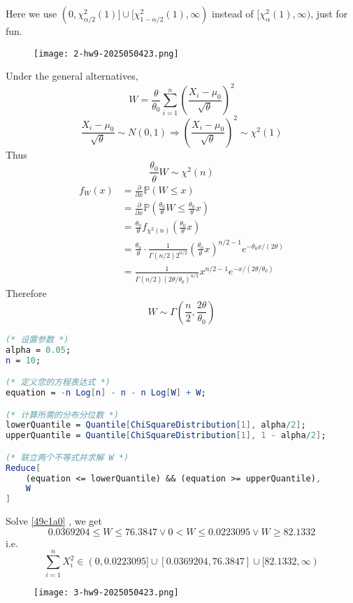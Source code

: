 \begin{remark}
Here we use $(0,\chi^{2}_{\alpha/2 }(1)]\cup[\chi^{2}_{1-\alpha/2 }(1),\infty)$ instead of $[\chi^{2}_{\alpha}(1),\infty)$, just for fun.
\end{remark}
\begin{exercise}
\begin{figure}[H]
\centering
\texttt{[image: 2-hw9-2025050423.png]}
\label{}
\end{figure}
\end{exercise}
Under the general alternatives,
\[
W=\frac{\theta}{\theta_0}\sum_{i=1}^{n} \left( \frac{X_i-\mu_0}{\sqrt{ \theta }} \right)^2
\]
\[
\frac{X_i-\mu_0}{\sqrt{ \theta }}\sim N(0,1)\Rightarrow\left( \frac{X_i-\mu_0}{\sqrt{ \theta }} \right)^2 \sim \chi^{2}(1)
\]
Thus
\[
\frac{\theta_0}{\theta}W\sim \chi^{2}(n)
\]
\[
\begin{aligned}
f_{W}(x) & =\frac{ \partial   }{ \partial x } \mathbb{P}(W\leq x) \\
 & =\frac{ \partial   }{ \partial x } \mathbb{P}\left( \frac{\theta_0}{\theta}W\leq \frac{\theta_0}{\theta}x \right) \\
 & =\frac{\theta_0}{\theta}f_{\chi^{2}(n)}\left( \frac{\theta_0}{\theta}x \right) \\
 & =\frac{\theta_0}{\theta}\cdot\frac{1}{\Gamma(n/2 )2^{n/2 }}\left( \frac{\theta_0}{\theta}x \right)^{n/2-1 }e^{ -\theta_0x/(2\theta) } \\
 & =\frac{1}{\Gamma(n/2 )(2\theta/\theta_0)^{n/2 }}x^{n/2-1}e^{ -x/(2\theta/\theta_0) }
\end{aligned}
\]
Therefore
\[
W\sim \Gamma\left( \frac{n}{2},\frac{2\theta}{\theta_0} \right)
\]
\begin{lstlisting}[language=mathematica]
(* 设置参数 *)
alpha = 0.05;
n = 10;

(* 定义您的方程表达式 *)
equation = -n Log[n] - n - n Log[W] + W;

(* 计算所需的分布分位数 *)
lowerQuantile = Quantile[ChiSquareDistribution[1], alpha/2];
upperQuantile = Quantile[ChiSquareDistribution[1], 1 - alpha/2];

(* 联立两个不等式并求解 W *)
Reduce[
    (equation <= lowerQuantile) && (equation >= upperQuantile),
    W
]
\end{lstlisting}
Solve \cref{49c1a0} , we get
\[
0.0369204\leq W\leq 76.3847\lor 0<W\leq 0.0223095\lor W\geq 82.1332
\]
i.e.
\[
\sum_{i=1}^{n} X_i^2\in(0,0.0223095]\cup[0.0369204,76.3847]\cup[82.1332,\infty)
\]
\begin{exercise}
\begin{figure}[H]
\centering
\texttt{[image: 3-hw9-2025050423.png]}
\label{}
\end{figure}
\end{exercise}
